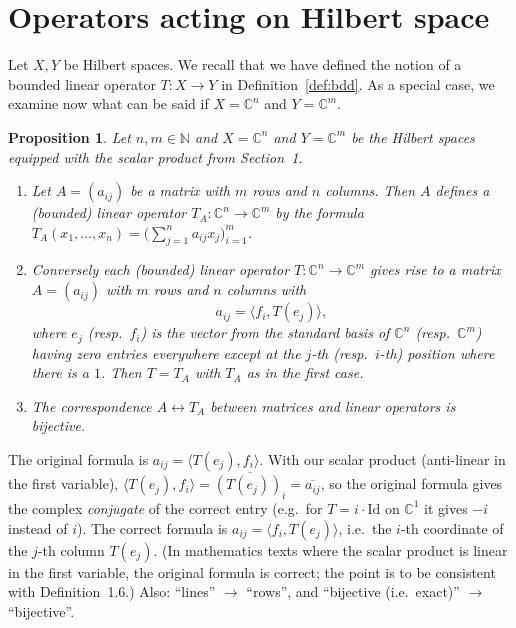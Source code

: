 \documentclass[11pt,a4paper]{article}
\numberwithin{equation}{section}
\newcommand{\N}{\mathbb{N}}
\newcommand{\C}{\mathbb{C}}
\newcommand{\ip}[2]{\langle #1, #2\rangle}
\newcommand{\conj}[1]{\overline{#1}}
\theoremstyle{plain}
\newtheorem{proposition}[theorem]{Proposition}
\theoremstyle{definition}
\theoremstyle{plain}
\theoremstyle{definition}
\begin{document}
\section{Operators acting on Hilbert space}

Let $X,Y$ be Hilbert spaces. We recall that we have defined the notion of a bounded linear
operator $T:X\to Y$ in Definition~\ref{def:bdd}. As a special case, we examine now what can
be said if $X=\C^n$ and $Y=\C^m$.

\begin{proposition}\label{prop:matrix}
Let $n,m\in\N$ and $X=\C^n$ and $Y=\C^m$ be the Hilbert spaces equipped with the scalar
product from Section~1.
\begin{enumerate}
\item Let $A=(a_{ij})$ be a matrix with $m$ rows and $n$ columns. Then $A$ defines a
(bounded) linear operator $T_A:\C^n\to\C^m$ by the formula
$T_A(x_1,\dots,x_n)=\big(\sum_{j=1}^na_{ij}x_j\big)_{i=1}^m$.
\item Conversely each (bounded) linear operator $T:\C^n\to\C^m$ gives rise to a matrix
$A=(a_{ij})$ with $m$ rows and $n$ columns with
\[
a_{ij}=\ip{f_i}{T(e_j)} ,
\]
where $e_j$ (resp.\ $f_i$) is the vector from the standard basis of $\C^n$ (resp.\ $\C^m$)
having zero entries everywhere except at the $j$-th (resp.\ $i$-th) position where there
is a $1$. Then $T=T_A$ with $T_A$ as in the first case.
\item The correspondence $A\longleftrightarrow T_A$ between matrices and linear operators is
bijective.
\end{enumerate}
\end{proposition}

\begin{correction}[(Prop.~4.1(2))]
The original formula is $a_{ij}=\ip{T(e_j)}{f_i}$. With our scalar product (anti-linear in
the first variable), $\ip{T(e_j)}{f_i}=\conj{(T(e_j))_i}=\conj{a_{ij}}$, so the original
formula gives the complex \emph{conjugate} of the correct entry (e.g.\ for $T=i\cdot\mathrm{Id}$
on $\C^1$ it gives $-i$ instead of $i$). The correct formula is $a_{ij}=\ip{f_i}{T(e_j)}$,
i.e.\ the $i$-th coordinate of the $j$-th column $T(e_j)$. (In mathematics texts where the
scalar product is linear in the first variable, the original formula is correct; the
point is to be consistent with Definition~1.6.) Also: ``lines'' $\to$ ``rows'', and
``bijective (i.e.\ exact)'' $\to$ ``bijective''.
\end{correction}
\end{document}
